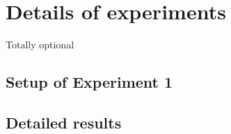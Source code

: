 \chapter{Details of experiments}
\label{app:details}

Totally optional
\section{Setup of Experiment 1}
\section{Detailed results}
